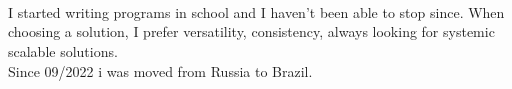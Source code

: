     \begin{minipage}[t]{0.275\textwidth} %
        \vspace{-\baselineskip} %

        \\
         \\
         \\
    \end{minipage}

    \vspace{0.5cm}



    \begin{minipage}[t]{0.4\textwidth} %
        \vspace{-\baselineskip} %

        I started writing programs in school and I haven't been able to stop since. When choosing a solution, I prefer versatility, consistency, always looking for systemic scalable solutions.\\Since 09/2022 i was moved from Russia to Brazil.
    \end{minipage}
    \hfill %
    \begin{minipage}[t]{0.5\textwidth} %


        \vspace{-\baselineskip} %
        \begin{barchart}{5.5}
        \end{barchart}
    \end{minipage}


